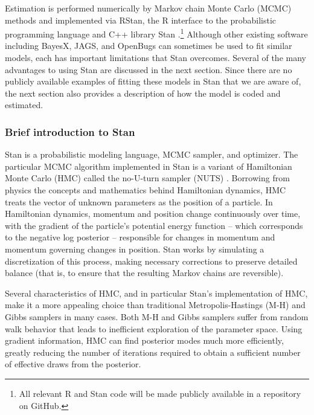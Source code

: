 Estimation is performed numerically by Markov chain Monte Carlo (MCMC) methods and implemented via RStan, the R interface to the probabilistic programming language and C++ library Stan .\footnote{All relevant R and Stan code will be made publicly available in a repository on GitHub.} Although other existing software including BayesX, JAGS, and OpenBugs can sometimes be used to fit similar models, each has important limitations that Stan overcomes. Several of the many advantages to using Stan are discussed in the next section. Since there are no publicly available examples of fitting these models in Stan that we are aware of, the next section also provides a description of how the model is coded and estimated. 

\subsubsection{Brief introduction to Stan}

Stan is a probabilistic modeling language, MCMC sampler, and optimizer. The particular MCMC algorithm implemented in Stan is a variant of Hamiltonian Monte Carlo (HMC) called the no-U-turn sampler (NUTS) . Borrowing from physics the concepts and mathematics behind Hamiltonian dynamics, HMC treats the vector of unknown parameters as the position of a particle. In Hamiltonian dynamics, momentum and position change continuously over time, with the gradient of the particle's potential energy function --  which corresponds to the negative log posterior -- responsible for changes in momentum and momentum governing changes in position. Stan works by simulating a discretization of this process, making necessary corrections to preserve detailed balance (that is, to ensure that the resulting Markov chains are reversible). 

Several characteristics of HMC, and in particular Stan's implementation of HMC, make it a more appealing choice than traditional Metropolis-Hastings (M-H) and Gibbs samplers in many cases. Both M-H and Gibbs samplers suffer from random walk behavior that leads to inefficient exploration of the parameter space. Using gradient information, HMC can find posterior modes much more efficiently, greatly reducing the number of iterations required to obtain a sufficient number of effective draws from the posterior. 

